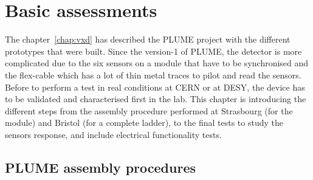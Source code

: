 \chapter{Basic assessments}
\label{chap:labTests}

  The chapter~\ref{chap:vxd} has described the \gls{PLUME} project with the different prototypes that were built. 
  Since the version-1 of \gls{PLUME}, the detector is more complicated due to the six sensors on a module that have to be synchronised and the flex-cable which has a lot of thin metal traces to pilot and read the sensors.
  Before to perform a test in real conditions at CERN or at DESY, the device has to be validated and characterised first in the lab.
  This chapter is introducing the different steps from the assembly procedure performed at Strasbourg (for the module) and Bristol (for a complete ladder), to the final tests to study the sensors response, and include electrical functionality tests.

 
 \minitoc
  

\section{PLUME assembly procedures}

